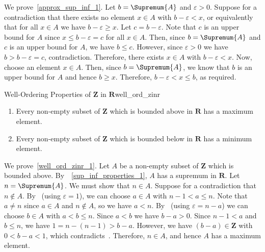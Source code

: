 \begin{Proof}{}{}
    We prove~\ref{approx_sup_inf_1}. Let $ b=\Supremum{A} $
    and $ \varepsilon>0 $. Suppose for a contradiction that there exists no
    element $ x\in A $ with $ b-\varepsilon<x $, or equivalently
    that for all $ x\in A $ we have $ b-\varepsilon\ge x $.
    Let $ c=b-\varepsilon $. Note that $ c $ is an upper bound
    for $ A $ since $ x\le b-\varepsilon=c $ for all $ x\in A $. Then,
    since $ b=\Supremum{A} $ and $ c $ is an upper bound for
    $ A $, we have $ b\le c $. However, since $ \varepsilon>0 $
    we have $ b>b-\varepsilon=c $, contradiction. Therefore,
    there exists $ x\in A $ with $ b-\varepsilon<x $. Now,
    choose an element $ x\in A $. Then, since $ b=\Supremum{A} $,
    we know that $ b $ is an upper bound for $ A $ and hence $ b\ge x $.
    Therefore, $ b-\varepsilon<x\le b $, as required.
\end{Proof}
\begin{Theorem}{Well-Ordering Properties of $ \mathbf{Z} $ in $ \mathbf{R} $}{well_ord_zinr}
    \begin{enumerate}[label=(\arabic*)]
        \item\label{well_ord_zinr_1}Every non-empty subset of $ \mathbf{Z} $ which is bounded
              above in $ \mathbf{R} $ has a maximum element.
        \item Every non-empty subset of $ \mathbf{Z} $ which is bounded
              below in $ \mathbf{R} $ has a minimum element.
    \end{enumerate}
\end{Theorem}
\begin{Proof}{}{}
    We prove~\ref{well_ord_zinr_1}. Let $ A $ be a non-empty subset of
    $ \mathbf{Z} $ which is bounded above.
    By~~\ref{sup_inf_properties_1},
    $ A $ has a supremum in $ \mathbf{R} $. Let $ n=\Supremum{A} $.
    We must show that $ n\in A $. Suppose for a contradiction
    that $ n\notin A $. By~ (using $ \varepsilon=1 $),
    we can choose $ a\in A $ with $ n-1<a\le n $. Note that $ a\neq n $
    since $ a\in A $ and $ n\notin A $, so we have $ a<n $. By~
    (using $ \varepsilon=n-a $) we can choose $ b\in A $ with
    $ a<b\le n $. Since $ a<b $ we have $ b-a>0 $. Since $ n-1<a $
    and $ b\le n $, we have $ 1=n-(n-1)>b-a $. However,
    we have $ (b-a)\in\mathbf{Z} $ with $ 0<b-a<1 $,
    which contradicts~. Therefore, $ n\in A $,
    and hence $ A $ has a maximum element.
\end{Proof}
